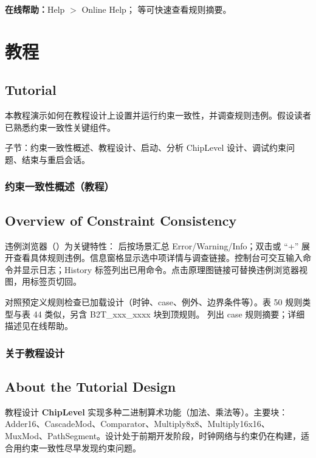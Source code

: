 \textbf{在线帮助：}Help $>$ Online Help； 等可快速查看规则摘要。

\section{教程}
\subsection*{Tutorial}

本教程演示如何在教程设计上设置并运行约束一致性，并调查规则违例。假设读者已熟悉约束一致性关键组件。

子节：约束一致性概述、教程设计、启动、分析 ChipLevel 设计、调试约束问题、结束与重启会话。

\subsubsection{约束一致性概述（教程）}
\subsection*{Overview of Constraint Consistency}

违例浏览器（）为关键特性： 后按场景汇总 Error/Warning/Info；双击或 “+” 展开查看具体规则违例。信息窗格显示选中项详情与调查链接。控制台可交互输入命令并显示日志；History 标签列出已用命令。点击原理图链接可替换违例浏览器视图，用标签页切回。

 对照预定义规则检查已加载设计（时钟、case、例外、边界条件等）。表 50 规则类型与表 44 类似，另含 B2T\_xxx\_xxxx 块到顶规则。 列出 case 规则摘要；详细描述见在线帮助。

\subsubsection{关于教程设计}
\subsection*{About the Tutorial Design}

教程设计 \textbf{ChipLevel} 实现多种二进制算术功能（加法、乘法等）。主要块：Adder16、CascadeMod、Comparator、Multiply8x8、Multiply16x16、MuxMod、PathSegment。设计处于前期开发阶段，时钟网络与约束仍在构建，适合用约束一致性尽早发现约束问题。

